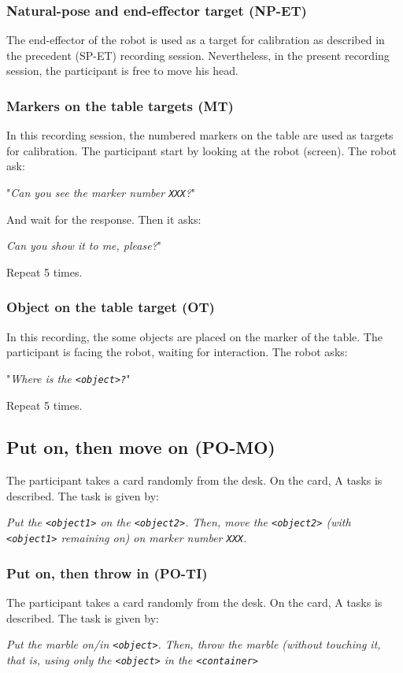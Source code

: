 \documentclass[11pt,a4paper]{article}
\begin{document}
\subsubsection{Natural-pose and end-effector target (NP-ET)}
The end-effector of the robot is used as a target for calibration as described in the precedent (SP-ET) recording session. Nevertheless, in the present recording session, the participant is free to move his head.

\subsubsection{Markers on the table targets (MT)}
In this recording session, the numbered markers on the table are used as targets for calibration. The participant start by looking at the robot (screen). The robot ask: 
\begin{center}
"\textit{Can you see the marker number \texttt{XXX}?}" 
\end{center}
And wait for the response. Then it asks: 
\begin{center}
\textit{Can you show it to me, please?}"
\end{center}
 Repeat 5 times.
 
\subsubsection{Object on the table target (OT)}
In this recording, the some objects are placed on the marker of the table. The participant is facing the robot, waiting for interaction. The robot asks: 
\begin{center}
"\textit{Where is the \texttt{<object>?}}"
\end{center}
Repeat 5 times.

\subsection{Put on, then move on (PO-MO)}
The participant takes a card randomly from the desk. On the card, A tasks is described. The task is given by:
\begin{center}
\textit{Put the \texttt{<object1>} on the \texttt{<object2>}. Then, move the \texttt{<object2>} (with \texttt{<object1>} remaining on) on marker number \texttt{XXX}.}
\end{center}

\subsubsection{Put on, then throw in (PO-TI)}
The participant takes a card randomly from the desk. On the card, A tasks is described. The task is given by:
\begin{center}
\textit{Put the marble on/in \texttt{<object>}. Then, throw the marble (without touching it, that is, using only the \texttt{<object>} in the \texttt{<container>}}
\end{center}
\end{document}
